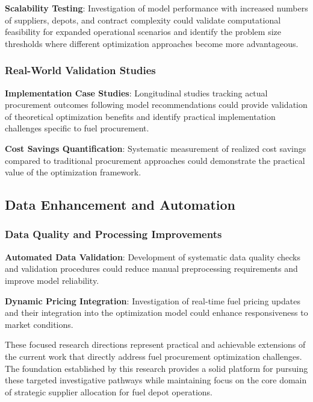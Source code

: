 \textbf{Scalability Testing}: Investigation of model performance with increased numbers of suppliers, depots, and contract complexity could validate computational feasibility for expanded operational scenarios and identify the problem size thresholds where different optimization approaches become more advantageous.

\subsubsection{Real-World Validation Studies}
\textbf{Implementation Case Studies}: Longitudinal studies tracking actual procurement outcomes following model recommendations could provide validation of theoretical optimization benefits and identify practical implementation challenges specific to fuel procurement.

\textbf{Cost Savings Quantification}: Systematic measurement of realized cost savings compared to traditional procurement approaches could demonstrate the practical value of the optimization framework.

\fi

\subsection{Data Enhancement and Automation}

\subsubsection{Data Quality and Processing Improvements}
\textbf{Automated Data Validation}: Development of systematic data quality checks and validation procedures could reduce manual preprocessing requirements and improve model reliability.

\textbf{Dynamic Pricing Integration}: Investigation of real-time fuel pricing updates and their integration into the optimization model could enhance responsiveness to market conditions.

These focused research directions represent practical and achievable extensions of the current work that directly address fuel procurement optimization challenges. The foundation established by this research provides a solid platform for pursuing these targeted investigative pathways while maintaining focus on the core domain of strategic supplier allocation for fuel depot operations.
